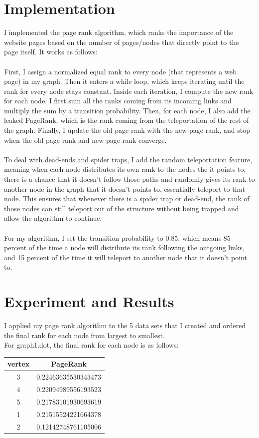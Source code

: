 \documentclass[9pt,twoside]{exam}
\begin{document}
\section*{Implementation}
I implemented the page rank algorithm, which ranks the importance of the website pages based on the number of pages/nodes that directly point to the page itself. It works as follows: \\\\
First, I assign a normalized equal rank to every node (that represents a web page) in my graph. Then it enters a while loop, which keeps iterating until the rank for every node stays constant. Inside each iteration, I compute the new rank for each node. I first sum all the ranks coming from its incoming links and multiply the sum by a transition probability. Then, for each node, I also add the leaked PageRank, which is the rank coming from the teleportation of the rest of the graph. Finally, I update the old page rank with the new page rank, and stop when the old page rank and new page rank converge. \\\\
To deal with dead-ends and spider traps, I add the random teleportation feature, meaning when each node distributes its own rank to the nodes the it points to, there is a chance that it doesn't follow those paths and randomly gives its rank to another node in the graph that it doesn't points to, essentially teleport to that node. This ensures that whenever there is a spider trap or dead-end, the rank of those nodes can still teleport out of the structure without being trapped and allow the algorithm to continue.  \\\\
For my algorithm, I set the transition probability to 0.85, which means 85 percent of the time a node will distribute its rank following the outgoing links, and 15 percent of the time it will teleport to another node that it doesn't point to.


\section*{Experiment and Results}

I applied my page rank algorithm to the 5 data sets that I created and ordered the final rank for each node from largest to smallest. \\

For graph1.dot, the final rank for each node is as follows:\\
\begin{center}
\begin{tabular}{ |c|c| } 
 \hline
 vertex & PageRank  \\ 
\hline
 3 & 0.22463635530343473  \\ 
 4 & 0.22094989556193523  \\ 
  5 & 0.21783101930693619  \\ 
   1 & 0.21515524221664378  \\ 
    2 & 0.12142748761105006  \\ 
 \hline
\end{tabular}
\end{center} 
\end{document}
